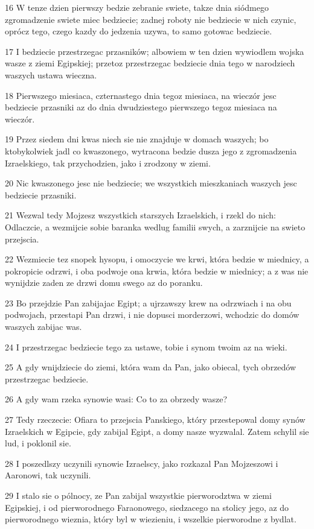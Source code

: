 \par 16 W tenze dzien pierwszy bedzie zebranie swiete, takze dnia siódmego zgromadzenie swiete miec bedziecie; zadnej roboty nie bedziecie w nich czynic, oprócz tego, czego kazdy do jedzenia uzywa, to samo gotowac bedziecie.
\par 17 I bedziecie przestrzegac przasników; albowiem w ten dzien wywiodlem wojska wasze z ziemi Egipskiej; przetoz przestrzegac bedziecie dnia tego w narodziech waszych ustawa wieczna.
\par 18 Pierwszego miesiaca, czternastego dnia tegoz miesiaca, na wieczór jesc bedziecie przasniki az do dnia dwudziestego pierwszego tegoz miesiaca na wieczór.
\par 19 Przez siedem dni kwas niech sie nie znajduje w domach waszych; bo ktobykolwiek jadl co kwaszonego, wytracona bedzie dusza jego z zgromadzenia Izraelskiego, tak przychodzien, jako i zrodzony w ziemi.
\par 20 Nic kwaszonego jesc nie bedziecie; we wszystkich mieszkaniach waszych jesc bedziecie przasniki.
\par 21 Wezwal tedy Mojzesz wszystkich starszych Izraelskich, i rzekl do nich: Odlaczcie, a wezmijcie sobie baranka wedlug familii swych, a zarznijcie na swieto przejscia.
\par 22 Wezmiecie tez snopek hysopu, i omoczycie we krwi, która bedzie w miednicy, a pokropicie odrzwi, i oba podwoje ona krwia, która bedzie w miednicy; a z was nie wynijdzie zaden ze drzwi domu swego az do poranku.
\par 23 Bo przejdzie Pan zabijajac Egipt; a ujrzawszy krew na odrzwiach i na obu podwojach, przestapi Pan drzwi, i nie dopusci morderzowi, wchodzic do domów waszych zabijac was.
\par 24 I przestrzegac bedziecie tego za ustawe, tobie i synom twoim az na wieki.
\par 25 A gdy wnijdziecie do ziemi, która wam da Pan, jako obiecal, tych obrzedów przestrzegac bedziecie.
\par 26 A gdy wam rzeka synowie wasi: Co to za obrzedy wasze?
\par 27 Tedy rzeczecie: Ofiara to przejscia Panskiego, który przestepowal domy synów Izraelskich w Egipcie, gdy zabijal Egipt, a domy nasze wyzwalal. Zatem schylil sie lud, i poklonil sie.
\par 28 I poszedlszy uczynili synowie Izraelscy, jako rozkazal Pan Mojzeszowi i Aaronowi, tak uczynili.
\par 29 I stalo sie o pólnocy, ze Pan zabijal wszystkie pierworodztwa w ziemi Egipskiej, i od pierworodnego Faraonowego, siedzacego na stolicy jego, az do pierworodnego wieznia, który byl w wiezieniu, i wszelkie pierworodne z bydlat.
